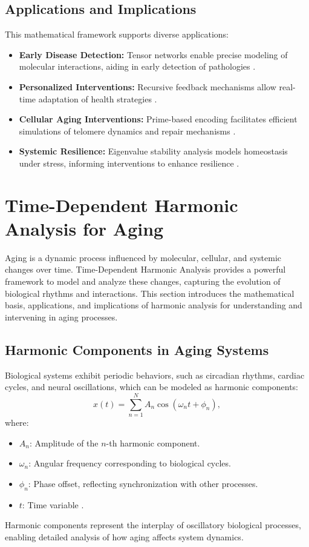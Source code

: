 \documentclass{article}
\theoremstyle{plain}
\begin{document}
\subsection{Applications and Implications}
This mathematical framework supports diverse applications:
\begin{itemize}
    \item \textbf{Early Disease Detection:} Tensor networks enable precise modeling of molecular interactions, aiding in early detection of pathologies \cite{earlyDetection2022}.
    \item \textbf{Personalized Interventions:} Recursive feedback mechanisms allow real-time adaptation of health strategies \cite{personalizedMedicine2023}.
    \item \textbf{Cellular Aging Interventions:} Prime-based encoding facilitates efficient simulations of telomere dynamics and repair mechanisms \cite{agingSimulations2023}.
    \item \textbf{Systemic Resilience:} Eigenvalue stability analysis models homeostasis under stress, informing interventions to enhance resilience \cite{resilienceModeling2023}.
\end{itemize}

\section{Time-Dependent Harmonic Analysis for Aging}
\label{sec:harmonic_analysis}

Aging is a dynamic process influenced by molecular, cellular, and systemic changes over time. Time-Dependent Harmonic Analysis provides a powerful framework to model and analyze these changes, capturing the evolution of biological rhythms and interactions. This section introduces the mathematical basis, applications, and implications of harmonic analysis for understanding and intervening in aging processes.

\subsection{Harmonic Components in Aging Systems}
Biological systems exhibit periodic behaviors, such as circadian rhythms, cardiac cycles, and neural oscillations, which can be modeled as harmonic components:
\begin{equation}
x(t) = \sum_{n=1}^{N} A_n \cos(\omega_n t + \phi_n),
\end{equation}
where:
\begin{itemize}
    \item $A_n$: Amplitude of the $n$-th harmonic component.
    \item $\omega_n$: Angular frequency corresponding to biological cycles.
    \item $\phi_n$: Phase offset, reflecting synchronization with other processes.
    \item $t$: Time variable \cite{harmonicBiology2023}.
\end{itemize}
Harmonic components represent the interplay of oscillatory biological processes, enabling detailed analysis of how aging affects system dynamics.
\end{document}
